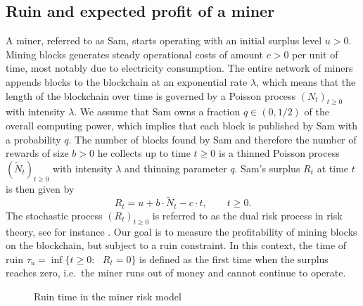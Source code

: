 \subsection{Ruin and expected profit of a miner}\label{ssec:selfish_mining}
A miner, referred to as Sam, starts operating with an initial surplus level $u>0$. Mining blocks generates steady operational costs of amount $c>0$ per unit of time, most notably due to electricity consumption. The entire network of miners appends blocks to the blockchain at an exponential rate $\lambda$, which means that the length of the blockchain over time is governed by a Poisson process $(N_t)_{t\geq0}$ with intensity $\lambda$. We assume that Sam owns a fraction $q\in(0,1/2)$ of the overall computing power, which implies that each block is published by Sam with a probability $q$. The number of blocks found by Sam and therefore the number of rewards of size $b>0$ he collects up to time $t\geq 0$ is a thinned Poisson process $(\tilde{N}_t)_{t\geq0}$ with intensity $\lambda$ and thinning parameter $q$. Sam's surplus $R_t$ at time $t$ is then given by  
\begin{equation}\label{eq:surplus_protocol}
R_t = u + b\cdot\tilde{N}_t - c\cdot t,\qquad t\ge 0.
\end{equation}
The stochastic process $(R_t)_{t\geq0}$ is referred to as the dual risk process in risk theory, see for instance \citet{Avanzi2007}. Our goal is to measure the profitability of mining blocks on the blockchain, but subject to a ruin constraint. In this context, the time of ruin $\tau_u = \inf\{t\geq0:\text{ }R_t = 0\}$ is defined as the first time when the surplus reaches zero, i.e.\ the miner runs out of money and cannot continue to operate. 
\begin{figure}[!ht]
\begin{center}
\end{center}
\caption{Ruin time in the miner risk model}
\label{fig:ruin_time_miner}
\end{figure}
